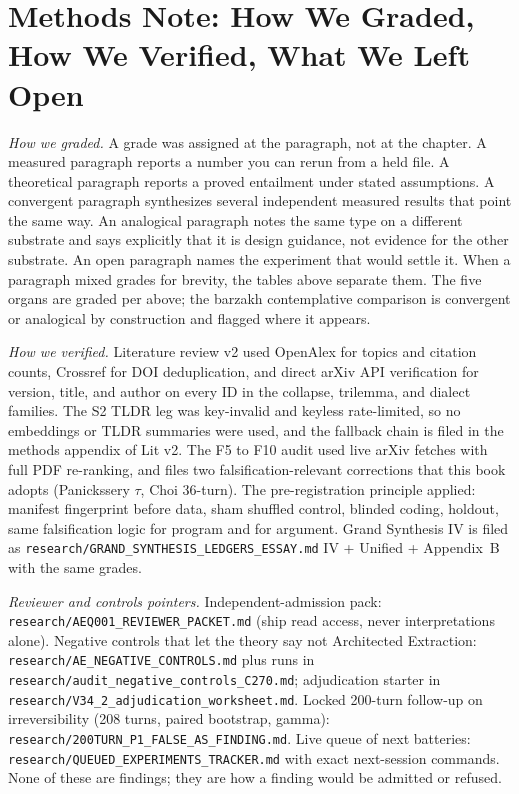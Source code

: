 \section{Methods Note: How We Graded, How We Verified, What We Left Open}
\label{sec:appendix-methods}

\textit{How we graded.} A grade was assigned at the paragraph, not at the chapter. A measured paragraph reports a number you can rerun from a held file. A theoretical paragraph reports a proved entailment under stated assumptions. A convergent paragraph synthesizes several independent measured results that point the same way. An analogical paragraph notes the same type on a different substrate and says explicitly that it is design guidance, not evidence for the other substrate. An open paragraph names the experiment that would settle it. When a paragraph mixed grades for brevity, the tables above separate them. The five organs are graded per above; the barzakh contemplative comparison is convergent or analogical by construction and flagged where it appears.

\textit{How we verified.} Literature review v2 used OpenAlex for topics and citation counts, Crossref for DOI deduplication, and direct arXiv API verification for version, title, and author on every ID in the collapse, trilemma, and dialect families. The S2 TLDR leg was key-invalid and keyless rate-limited, so no embeddings or TLDR summaries were used, and the fallback chain is filed in the methods appendix of Lit v2. The F5 to F10 audit used live arXiv fetches with full PDF re-ranking, and files two falsification-relevant corrections that this book adopts (Panickssery $\tau$, Choi 36-turn). The pre-registration principle applied: manifest fingerprint before data, sham shuffled control, blinded coding, holdout, same falsification logic for program and for argument. Grand Synthesis IV is filed as \texttt{research/GRAND\_SYNTHESIS\_LEDGERS\_ESSAY.md} IV + Unified + Appendix~B with the same grades.

\textit{Reviewer and controls pointers.} Independent-admission pack: \texttt{research/AEQ001\_REVIEWER\_PACKET.md} (ship read access, never interpretations alone). Negative controls that let the theory say not Architected Extraction: \texttt{research/AE\_NEGATIVE\_CONTROLS.md} plus runs in \texttt{research/audit\_negative\_controls\_C270.md}; adjudication starter in \texttt{research/V34\_2\_adjudication\_worksheet.md}. Locked 200-turn follow-up on irreversibility (208 turns, paired bootstrap, gamma): \texttt{research/200TURN\_P1\_FALSE\_AS\_FINDING.md}. Live queue of next batteries: \texttt{research/QUEUED\_EXPERIMENTS\_TRACKER.md} with exact next-session commands. None of these are findings; they are how a finding would be admitted or refused.

